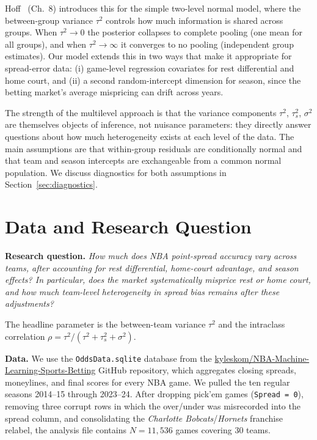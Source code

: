 \documentclass[11pt]{article}
\begin{document}
Hoff~\cite{hoff} (Ch.~8) introduces this for the simple two-level normal
model, where the between-group variance $\tau^2$ controls how much information
is shared across groups. When $\tau^2 \to 0$ the posterior collapses to
complete pooling (one mean for all groups), and when $\tau^2 \to \infty$ it
converges to no pooling (independent group estimates). Our model extends
this in two ways that make it appropriate for spread-error data: (i)
game-level regression covariates for rest differential and home court, and
(ii) a second random-intercept dimension for season, since the betting market's
average mispricing can drift across years.

The strength of the multilevel approach is that the variance components
$\tau^2$, $\tau_s^2$, $\sigma^2$ are themselves objects of inference, not
nuisance parameters: they directly answer questions about how much
heterogeneity exists at each level of the data. The main assumptions are
that within-group residuals are conditionally normal and that team and
season intercepts are exchangeable from a common normal population. We
discuss diagnostics for both assumptions in Section~\ref{sec:diagnostics}.

\section{Data and Research Question}

\textbf{Research question.} \emph{How much does NBA point-spread accuracy
vary across teams, after accounting for rest differential, home-court
advantage, and season effects? In particular, does the market systematically
misprice rest or home court, and how much team-level heterogeneity in spread
bias remains after these adjustments?}

The headline parameter is the between-team variance $\tau^2$ and the
intraclass correlation $\rho = \tau^2 / (\tau^2 + \tau_s^2 + \sigma^2)$.

\textbf{Data.} We use the \texttt{OddsData.sqlite} database from the
\href{https://github.com/kyleskom/NBA-Machine-Learning-Sports-Betting}%
{kyleskom/NBA-Machine-Learning-Sports-Betting} GitHub repository, which
aggregates closing spreads, moneylines, and final scores for every NBA game.
We pulled the ten regular seasons 2014--15 through 2023--24. After dropping
pick'em games (\texttt{Spread = 0}), removing three corrupt rows in which
the over/under was misrecorded into the spread column, and consolidating the
\textit{Charlotte Bobcats}/\textit{Hornets} franchise relabel, the analysis
file contains $N = 11{,}536$ games covering 30 teams.
\end{document}

